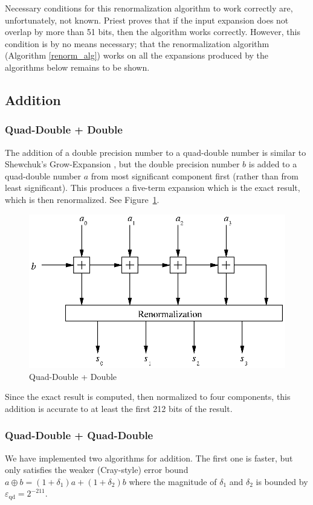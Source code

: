 \documentclass[11pt]{article}
\theoremstyle{definition}
\newcommand{\epsqd}{\varepsilon_\mathrm{qd}}
\begin{document}
Necessary conditions for this renormalization algorithm to work correctly
are, unfortunately, not known.  Priest proves that if the input expansion
does not overlap by more than 51 bits, then the algorithm works correctly.
However, this condition is by no means necessary; that the renormalization
algorithm (Algorithm \ref{renorm_alg})
works on all the expansions produced by the algorithms below 
remains to be shown.

\subsection{Addition}
\subsubsection{Quad-Double + Double}
The addition of a double precision number to a quad-double number
is similar to Shewchuk's {\sc Grow-Expansion} \cite[p. 316]{she97}, but the double 
precision number $b$ is added to a quad-double number $a$ from
most significant component first (rather than from least significant).
This produces a five-term expansion which is the exact result, 
which is then renormalized.  See Figure~\ref{qd_add_qd_d_fig}.

\begin{figure}
  \begin{center} 
    \includegraphics{qd_add_qd_d.eps}
    \caption{\label{qd_add_qd_d_fig}Quad-Double + Double}
  \end{center}
\end{figure}

Since the exact result is computed, then normalized to four components, 
this addition is accurate to at least the first 212 bits of the result.

\subsubsection{Quad-Double + Quad-Double}
We have implemented two algorithms for addition.  The first one
is faster, but only satisfies the weaker (Cray-style) error bound
$a \oplus b = (1 + \delta_1)a + (1 + \delta_2)b$ where the magnitude
of $\delta_1$ and $\delta_2$ is bounded by $\epsqd = 2^{-211}$.
\end{document}
